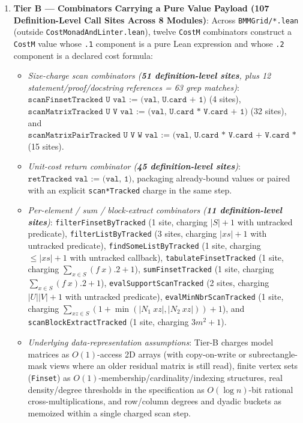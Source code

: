 \documentclass[10pt,letterpaper]{article}
\renewcommand{\_}{\origunderscore\allowbreak}
\newcommand{\code}[1]{\texttt{#1}}
\begin{document}
\begin{enumerate}
  \item \textbf{Tier B --- Combinators Carrying a Pure Value Payload (107 Definition-Level Call Sites Across 8 Modules)}:
  Across \code{BMMGrid/*.lean} (outside \code{CostMonadAndLinter.lean}), twelve \code{CostM} combinators construct a \code{CostM} value whose \code{.1} component is a pure Lean expression and whose \code{.2} component is a declared cost formula:
  \begin{itemize}
    \item \emph{Size-charge scan combinators (\textbf{51 definition-level sites}, plus 12 statement/proof/docstring references = 63 grep matches)}:
    $\code{scanFinsetTracked U val := (val, U.card + 1)}$ (4 sites),
    $\code{scanMatrixTracked U V val := (val, U.card * V.card + 1)}$ (32 sites), and
    $\code{scanMatrixPairTracked U V W val := (val, U.card * V.card + V.card * W.card + 1)}$ (15 sites).
    \item \emph{Unit-cost return combinator (\textbf{45 definition-level sites})}:
    $\code{retTracked val := (val, 1)}$, packaging already-bound values or paired with an explicit \code{scan*Tracked} charge in the same step.
    \item \emph{Per-element / sum / block-extract combinators (\textbf{11 definition-level sites})}:
    \code{filterFinsetByTracked} (1 site, charging $|S|+1$ with untracked predicate), \code{filterListByTracked} (3 sites, charging $|xs|+1$ with untracked predicate), \code{findSomeListByTracked} (1 site, charging $\le |xs|+1$ with untracked callback), \code{tabulateFinsetTracked} (1 site, charging $\sum_{x \in S} (f\ x).2 + 1$), \code{sumFinsetTracked} (1 site, charging $\sum_{x \in S} (f\ x).2 + 1$), \code{evalSupportScanTracked} (2 sites, charging $|U||V|+1$ with untracked predicate), \code{evalMinNbrScanTracked} (1 site, charging $\sum_{xz \in S}(1 + \min(|N_1\ xz|, |N_2\ xz|)) + 1$), and \code{scanBlockExtractTracked} (1 site, charging $3m^2 + 1$).
    \item \emph{Underlying data-representation assumptions}: Tier-B charges model matrices as $O(1)$-access 2D arrays (with copy-on-write or subrectangle-mask views where an older residual matrix is still read), finite vertex sets (\code{Finset}) as $O(1)$-membership/cardinality/indexing structures, real density/degree thresholds in the specification as $O(\log n)$-bit rational cross-multiplications, and row/column degrees and dyadic buckets as memoized within a single charged scan step.
  \end{itemize}
\end{enumerate}
\end{document}
